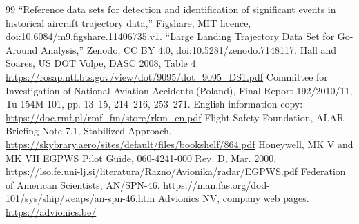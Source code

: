 \documentclass{ideathon2026}
\begin{document}
\begin{thebibliography}{99}
 ``Reference data sets for detection and identification of significant events in historical aircraft trajectory data,'' Figshare, MIT licence, doi:10.6084/m9.figshare.11406735.v1.
 ``Large Landing Trajectory Data Set for Go-Around Analysis,'' Zenodo, CC BY 4.0, doi:10.5281/zenodo.7148117.
 Hall and Soares, US DOT Volpe, DASC 2008, Table 4. \url{https://rosap.ntl.bts.gov/view/dot/9095/dot_9095_DS1.pdf}
 Committee for Investigation of National Aviation Accidents (Poland), Final Report 192/2010/11, Tu-154M 101, pp. 13--15, 214--216, 253--271. English information copy: \url{https://doc.rmf.pl/rmf_fm/store/rkm_en.pdf}
 Flight Safety Foundation, ALAR Briefing Note 7.1, Stabilized Approach. \url{https://skybrary.aero/sites/default/files/bookshelf/864.pdf}
 Honeywell, MK V and MK VII EGPWS Pilot Guide, 060-4241-000 Rev. D, Mar. 2000. \url{https://lso.fe.uni-lj.si/literatura/Razno/Avionika/radar/EGPWS.pdf}
 Federation of American Scientists, AN/SPN-46. \url{https://man.fas.org/dod-101/sys/ship/weaps/an-spn-46.htm}
 Advionics NV, company web pages. \url{https://advionics.be/}
\end{thebibliography}
\end{document}
